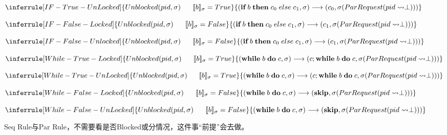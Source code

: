 \documentclass[UTF8, 8pt, a4paper ]{ctexart}
\begin{document}
\begin{small}
\begin{center}
		\kspace
		
		$
		\inferrule[IF-True-UnLocked]  %
		{ Unblocked(pid, \sigma)\;\;\;\;\;\;\llbracket b \rrbracket_{\sigma} = True}
		{ (\textbf{if}\;b\;\textbf{then}\;c_0\;else\;c_1, \sigma)\longrightarrow (c_0, \sigma(ParRequest(pid\rightsquigarrow \perp)))}
		$

		\kspace
		
		$
		\inferrule[IF-False-Locked]  %
		{ Unblocked(pid, \sigma)\;\;\;\;\;\;\llbracket b \rrbracket_{\sigma} = False}
		{ (\textbf{if}\;b\;\textbf{then}\;c_0\;else\;c_1, \sigma)\longrightarrow (c_1, \sigma(ParRequest(pid\rightsquigarrow \perp)))}
		$

		
		\kspace
		
		$
		\inferrule[IF-False-Unlocked]  %
		{ Unblocked(pid, \sigma)\;\;\;\;\;\;\llbracket b \rrbracket_{\sigma} = False}
		{ (\textbf{if}\;b\;\textbf{then}\;c_0\;else\;c_1, \sigma)\longrightarrow (c_1, \sigma(ParRequest(pid\rightsquigarrow \perp)))}
		$
		\kspace
		
		$
		\inferrule[While-True-Locked]
		{ Unblocked(pid, \sigma)\;\;\;\;\;\;\llbracket b \rrbracket_{\sigma} = True}
		{(\textbf{while}\;b\;\textbf{do}\;c, \sigma)\longrightarrow(c;\textbf{while}\;b\;\textbf{do}\;c, \sigma(ParRequest(pid\rightsquigarrow \perp)))}
		$

		\kspace
		$
		\inferrule[While-True-UnLocked]
		{ Unblocked(pid, \sigma)\;\;\;\;\;\;\llbracket b \rrbracket_{\sigma} = True}
		{(\textbf{while}\;b\;\textbf{do}\;c, \sigma)\longrightarrow(c;\textbf{while}\;b\;\textbf{do}\;c, \sigma(ParRequest(pid\rightsquigarrow \perp)))}
		$

		\kspace
		$
		\inferrule[While-False-Locked]
		{ Unblocked(pid, \sigma)\;\;\;\;\;\;\llbracket b \rrbracket_{\sigma} = False}
		{(\textbf{while}\;b\;\textbf{do}\;c, \sigma)\longrightarrow(\textbf{skip}, \sigma(ParRequest(pid\rightsquigarrow \perp)))}
		$
		
		\kspace
		$
		\inferrule[While-False-UnLocked]
		{ Unblocked(pid, \sigma)\;\;\;\;\;\;\llbracket b \rrbracket_{\sigma} = False}
		{(\textbf{while}\;b\;\textbf{do}\;c, \sigma)\longrightarrow(\textbf{skip}, \sigma(ParRequest(pid\rightsquigarrow \perp)))}
		$

		\kspace
		Seq Rule与Par Rule，不需要看是否Blocked或分情况，这件事“前提”会去做。


\end{center}
\end{small}
\end{document}
